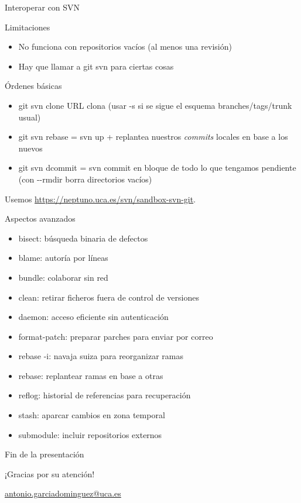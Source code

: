 \documentclass[xcolor=svgnames]{beamer}
\newcommand*{\tipo}[1]{\textit{#1}}
\newcommand*{\inlinecmd}[1]{{\small\ttfamily\nohyphens{#1}}}
\begin{document}
\begin{frame}{Interoperar con SVN}

  \begin{block}{Limitaciones}
    \begin{itemize}
    \item No funciona con repositorios vacíos (al menos una revisión)
    \item Hay que llamar a \inlinecmd{git svn} para ciertas cosas
    \end{itemize}
  \end{block}

  \begin{block}{Órdenes básicas}
    \begin{itemize}
    \item \inlinecmd{git svn clone URL} clona (usar \inlinecmd{-s} si
      se sigue el esquema branches/tags/trunk usual)
    \item \inlinecmd{git svn rebase} = \inlinecmd{svn up} + replantea
      nuestros \tipo{commits} locales en base a los nuevos
    \item \inlinecmd{git svn dcommit} = \inlinecmd{svn commit} en
      bloque de todo lo que tengamos pendiente (con
      \inlinecmd{{-}-rmdir} borra directorios vacíos)
    \end{itemize}
  \end{block}

  Usemos \url{https://neptuno.uca.es/svn/sandbox-svn-git}.

\end{frame}

\appendix

\begin{frame}{Aspectos avanzados}
  \begin{itemize}
  \item \inlinecmd{bisect}: búsqueda binaria de defectos
  \item \inlinecmd{blame}: autoría por líneas
  \item \inlinecmd{bundle}: colaborar sin red
  \item \inlinecmd{clean}: retirar ficheros fuera de control de versiones
  \item \inlinecmd{daemon}: acceso eficiente sin autenticación
  \item \inlinecmd{format-patch}: preparar parches para enviar por correo
  \item \inlinecmd{rebase -i}: navaja suiza para reorganizar ramas
  \item \inlinecmd{rebase}: replantear ramas en base a otras
  \item \inlinecmd{reflog}: historial de referencias para recuperación
  \item \inlinecmd{stash}: aparcar cambios en zona temporal
  \item \inlinecmd{submodule}: incluir repositorios externos
  \end{itemize}
\end{frame}

\begin{frame}{Fin de la presentación}
  \begin{center}
    {\Huge ¡Gracias por su atención!}

    \vspace{3em}

    {\Large
      \href{mailto:antonio.garciadominguez@uca.es}{antonio.garciadominguez@uca.es}}
  \end{center}
\end{frame}
\end{document}
